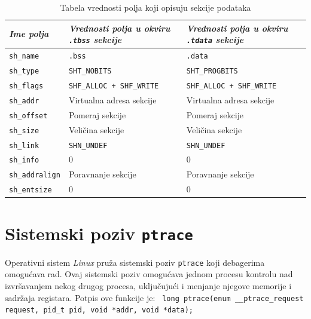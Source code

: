 \documentclass[12pt,oneside]{memoir}
\begin{document}
\begin{table}
	\begin{center}
		\begin{tabular}{ | l | p{5cm} | p{5cm} |}
			\hline
	    	\emph{Ime polja} & \emph{Vrednosti polja u okviru \texttt{.tbss} sekcije} & \emph{Vrednosti polja u okviru \texttt{.tdata} sekcije} \\ \hline
			\texttt{sh\_name} & \texttt{.bss} & \texttt{.data} \\ \hline
			\texttt{sh\_type} & \texttt{SHT\_NOBITS} & \texttt{SHT\_PROGBITS} \\ \hline
			\texttt{sh\_flags} & \texttt{SHF\_ALLOC + SHF\_WRITE} & \texttt{SHF\_ALLOC + SHF\_WRITE} \\ \hline
			\texttt{sh\_addr} & Virtualna adresa sekcije & Virtualna adresa sekcije \\ \hline
			\texttt{sh\_offset} & Pomeraj sekcije & Pomeraj sekcije \\ \hline
			\texttt{sh\_size} & Veličina sekcije & Veličina sekcije \\ \hline
			\texttt{sh\_link} & \texttt{SHN\_UNDEF} & \texttt{SHN\_UNDEF} \\ \hline
			\texttt{sh\_info} & 0 & 0 \\ \hline
			\texttt{sh\_addralign} & Poravnanje sekcije & Poravnanje sekcije \\ \hline
			\texttt{sh\_entsize} & 0 & 0 \\ \hline
		\end{tabular}
	\end{center}
	\caption{\label{tab:elf_secs}Tabela vrednosti polja koji opisuju sekcije podataka}
\end{table}

\section{Sistemski poziv \texttt{ptrace}}

Operativni sistem \emph{Linux} pruža sistemski poziv \texttt{ptrace} \cite{ptrace} koji debagerima omogućava rad. Ovaj sistemski poziv omogućava jednom procesu kontrolu nad izvršavanjem nekog drugog procesa, uključujući i menjanje njegove memorije i sadržaja registara.
Potpis ove funkcije je:
\newline\newline
\texttt{ long ptrace\newline(enum \_\_ptrace\_request request, pid\_t pid, void *addr, void *data);}
\newline
\end{document}
